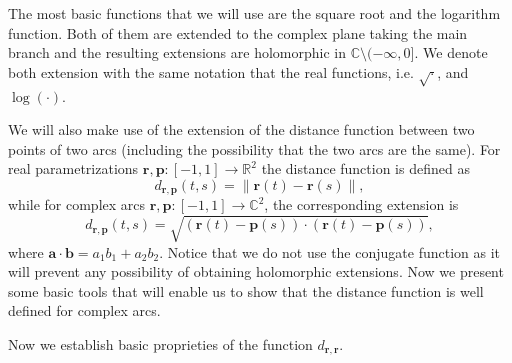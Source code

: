 \documentclass{article}
\newcommand{\ba} {\bm a}
\newcommand{\IC}{{\mathbb C}}
\newcommand{\IR}{{\mathbb R}}
\newcommand{\bp}{{\bm p}}
\newcommand{\br}{\bm{r}}
\newcommand{\bb}{\bm{b}}
\begin{document}
The most basic functions that we will use are the square root and the logarithm function. Both of them are extended to the complex plane taking the main branch and the resulting extensions are holomorphic in $\IC \setminus (-\infty,0]$. We denote both extension with the same notation that the real functions, i.e. $\sqrt{\cdot}$, and $\log{(\cdot)}$.   

We will also make use of the extension of the distance function between two points of two arcs (including the possibility that the two arcs are the same).  For real parametrizations $\br, \bp :[-1,1] \rightarrow \IR^2$ the distance function is defined as 
$$d_{\br,\bp}(t,s) = \| \br(t) - \br(s)\|,$$
while for complex arcs $\br, \bp :[-1,1] \rightarrow \IC^2$, the corresponding extension is 
$$d_{\br,\bp}(t,s) =  \sqrt{(\br(t)-\bp(s))\cdot (\br(t)-\bp(s))},$$
where $\ba \cdot \bb  = a_1 b_1 + a_2 b_2$. Notice that we do not use the conjugate function as it will prevent any possibility of obtaining holomorphic extensions.  Now we present some basic tools that will enable us to show that the distance function is well defined for complex arcs. 


Now we establish basic proprieties of the function $d_{\br,\br}$. 
\end{document}

